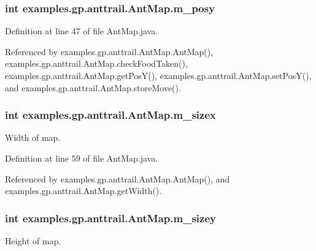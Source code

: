 \hypertarget{classexamples_1_1gp_1_1anttrail_1_1_ant_map_aeb439139e9d4dc14ae7c1717ae2a168c}{
\subsubsection[{m\-\_\-posy}]{\setlength{\rightskip}{0pt plus 5cm}int examples.\-gp.\-anttrail.\-Ant\-Map.\-m\-\_\-posy\hspace{0.3cm}{\ttfamily [private]}}}\label{classexamples_1_1gp_1_1anttrail_1_1_ant_map_aeb439139e9d4dc14ae7c1717ae2a168c}


Definition at line 47 of file Ant\-Map.\-java.



Referenced by examples.\-gp.\-anttrail.\-Ant\-Map.\-Ant\-Map(), examples.\-gp.\-anttrail.\-Ant\-Map.\-check\-Food\-Taken(), examples.\-gp.\-anttrail.\-Ant\-Map.\-get\-Pos\-Y(), examples.\-gp.\-anttrail.\-Ant\-Map.\-set\-Pos\-Y(), and examples.\-gp.\-anttrail.\-Ant\-Map.\-store\-Move().

\hypertarget{classexamples_1_1gp_1_1anttrail_1_1_ant_map_aa00ab3faf14fb86d7527f4a29f13b991}{
\subsubsection[{m\-\_\-sizex}]{\setlength{\rightskip}{0pt plus 5cm}int examples.\-gp.\-anttrail.\-Ant\-Map.\-m\-\_\-sizex\hspace{0.3cm}{\ttfamily [private]}}}\label{classexamples_1_1gp_1_1anttrail_1_1_ant_map_aa00ab3faf14fb86d7527f4a29f13b991}
Width of map. 

Definition at line 59 of file Ant\-Map.\-java.



Referenced by examples.\-gp.\-anttrail.\-Ant\-Map.\-Ant\-Map(), and examples.\-gp.\-anttrail.\-Ant\-Map.\-get\-Width().

\hypertarget{classexamples_1_1gp_1_1anttrail_1_1_ant_map_a008362c5dd5918e4717d29e16d8f6d9a}{
\subsubsection[{m\-\_\-sizey}]{\setlength{\rightskip}{0pt plus 5cm}int examples.\-gp.\-anttrail.\-Ant\-Map.\-m\-\_\-sizey\hspace{0.3cm}{\ttfamily [private]}}}\label{classexamples_1_1gp_1_1anttrail_1_1_ant_map_a008362c5dd5918e4717d29e16d8f6d9a}
Height of map. 

